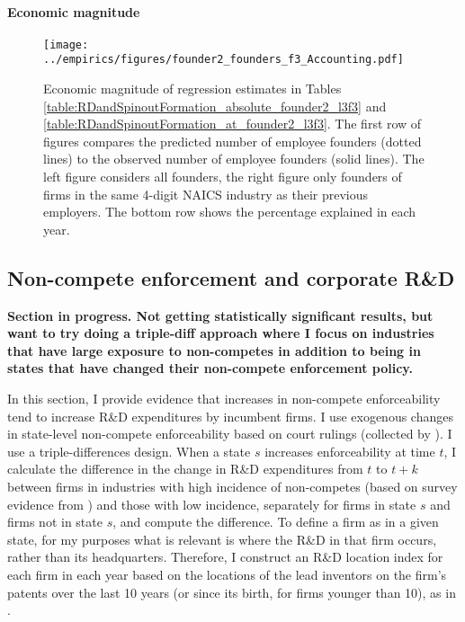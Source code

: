 \documentclass[12pt,english]{article}
\theoremstyle{remark}
\begin{document}
\paragraph{Economic magnitude}

\begin{figure}[!htb]
	\texttt{[image: ../empirics/figures/founder2\_founders\_f3\_Accounting.pdf]}
	\caption{Economic magnitude of regression estimates in Tables \ref{table:RDandSpinoutFormation_absolute_founder2_l3f3} and \ref{table:RDandSpinoutFormation_at_founder2_l3f3}. The first row of figures compares the predicted number of employee founders (dotted lines) to the observed number of employee founders (solid lines). The left figure considers all founders, the right figure only founders of firms in the same 4-digit NAICS industry as their previous employers. The bottom row shows the percentage explained in each year.}
	\label{figure:founder2_founders_f3_Accounting}
\end{figure}

\subsection{Non-compete enforcement and corporate R\&D}

\textbf{Section in progress. Not getting statistically significant results, but want to try doing a triple-diff approach where I focus on industries that have large exposure to non-competes in addition to being in states that have changed their non-compete enforcement policy.}

In this section, I provide evidence that increases in non-compete enforceability tend to increase R\&D expenditures by incumbent firms. I use exogenous changes in state-level non-compete enforceability based on court rulings (collected by \cite{jeffers_impact_2018}). I use a triple-differences design. When a state $s$ increases enforceability at time $t$, I calculate the difference in the change in R\&D expenditures from $t$ to $t+k$ between firms in industries with high incidence of non-competes (based on survey evidence from \cite{starr_noncompetes_2019}) and those with low incidence, separately for firms in state $s$ and firms not in state $s$, and compute the difference. To define a firm as in a given state, for my purposes what is relevant is where the R\&D in that firm occurs, rather than its headquarters. Therefore, I construct an R\&D location index for each firm in each year based on the locations of the lead inventors on the firm's patents over the last 10 years (or since its birth, for firms younger than 10), as in \cite{bloom_identifying_2013}. 
\end{document}
